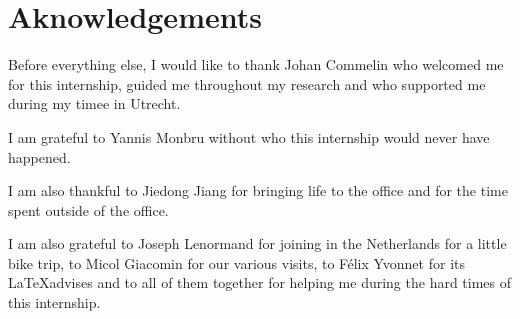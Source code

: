 \section*{Aknowledgements}

Before everything else, I would like to thank Johan Commelin who welcomed me for this internship, guided me throughout my research and who supported me during my timee in Utrecht.

I am grateful to Yannis Monbru without who this internship would never have happened.

I am also thankful to Jiedong Jiang for bringing life to the office and for the time spent outside of the office.

I am also grateful to Joseph Lenormand for joining in the Netherlands for a little bike trip, to Micol Giacomin for our various visits, to Félix Yvonnet for its \LaTeX advises and to all of them together for helping me during the hard times of this internship.
